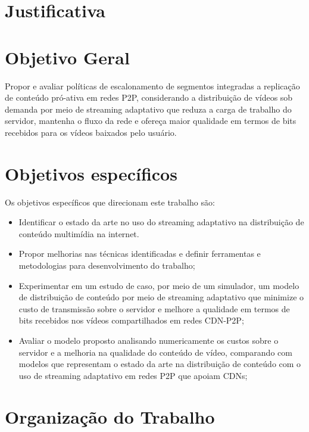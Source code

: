\documentclass[
	12pt,
	oneside,
	a4paper,
	english,
	brazil
	]{abntex2ppgsi}
\begin{document}
\section{Justificativa}


\section{Objetivo Geral}

Propor e avaliar políticas de escalonamento de segmentos integradas a replicação de conteúdo pró-ativa em redes P2P, considerando a distribuição de vídeos sob demanda por meio de streaming adaptativo que reduza a carga de trabalho do servidor, mantenha o fluxo da rede e ofereça maior qualidade em termos de bits recebidos para os vídeos baixados pelo usuário.


\section{Objetivos específicos}

Os objetivos específicos que direcionam este trabalho são:

\begin{itemize}
\item	Identificar o estado da arte no uso do streaming adaptativo na distribuição de conteúdo multimídia na internet.
\item 	Propor melhorias nas técnicas identificadas e definir ferramentas e metodologias para desenvolvimento do trabalho;
\item 	Experimentar em um estudo de caso, por meio de um simulador, um modelo de distribuição de conteúdo por meio de streaming adaptativo que minimize o custo de transmissão sobre o servidor e melhore a qualidade em termos de bits recebidos nos vídeos compartilhados em redes CDN-P2P;
\item 	Avaliar o modelo proposto analisando numericamente os custos sobre o servidor e a melhoria na qualidade do conteúdo de vídeo, comparando com modelos que representam o estado da arte na distribuição de conteúdo com o uso de streaming adaptativo em redes P2P que apoiam CDNs;
\end{itemize}

\section{Organização do Trabalho}
\end{document}
